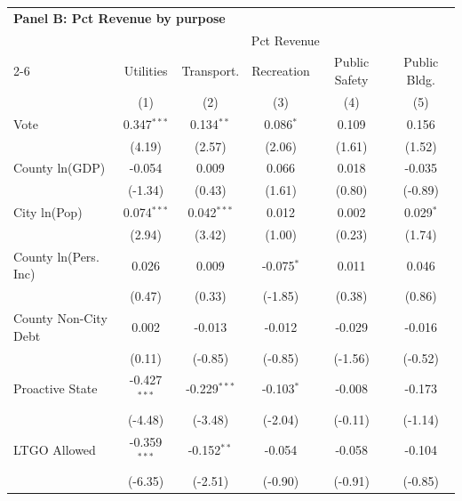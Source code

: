 \begingroup
\centering
\begin{tabular*}{\textwidth}{@{\extracolsep{\fill}}lccccc}
\multicolumn{5}{l}{\textbf{Panel B: Pct Revenue by purpose}}\\

\addlinespace
   \toprule
    & \multicolumn{5}{c}{Pct Revenue}\\
   \cmidrule(lr){2-6}
                        & Utilities      & Transport.     & Recreation   & Public Safety & Public Bldg. \\   
                        & (1)            & (2)            & (3)          & (4)           & (5)\\  
   \midrule 
   Vote                 & 0.347$^{***}$  & 0.134$^{**}$   & 0.086$^{*}$  & 0.109         & 0.156\\   
                        & (4.19)        & (2.57)        & (2.06)      & (1.61)       & (1.52)\\   
   County ln(GDP)       & -0.054         & 0.009          & 0.066        & 0.018         & -0.035\\   
                        & (-1.34)       & (0.43)        & (1.61)      & (0.80)       & (-0.89)\\   
   City ln(Pop)         & 0.074$^{***}$  & 0.042$^{***}$  & 0.012        & 0.002         & 0.029$^{*}$\\   
                        & (2.94)        & (3.42)        & (1.00)      & (0.23)       & (1.74)\\   
   County ln(Pers. Inc) & 0.026          & 0.009          & -0.075$^{*}$ & 0.011         & 0.046\\   
                        & (0.47)        & (0.33)        & (-1.85)     & (0.38)       & (0.86)\\   
   County Non-City Debt & 0.002          & -0.013         & -0.012       & -0.029        & -0.016\\   
                        & (0.11)        & (-0.85)       & (-0.85)     & (-1.56)      & (-0.52)\\   
   Proactive State      & -0.427$^{***}$ & -0.229$^{***}$ & -0.103$^{*}$ & -0.008        & -0.173\\   
                        & (-4.48)       & (-3.48)       & (-2.04)     & (-0.11)      & (-1.14)\\   
   LTGO Allowed         & -0.359$^{***}$ & -0.152$^{**}$  & -0.054       & -0.058        & -0.104\\   
                        & (-6.35)       & (-2.51)       & (-0.90)     & (-0.91)      & (-0.85)\\   

\end{tabular*}
